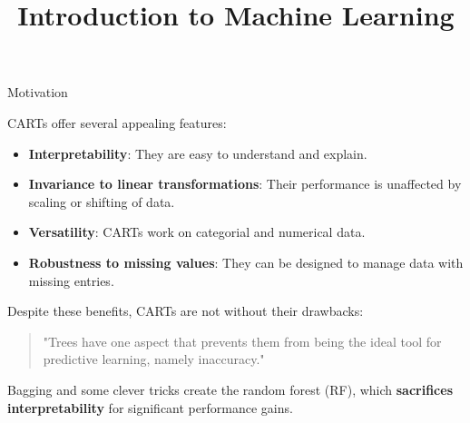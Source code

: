 \documentclass[11pt,compress,t,notes=noshow, xcolor=table]{beamer}
\title{Introduction to Machine Learning}
\institute{\href{https://compstat-lmu.github.io/lecture_i2ml/}{compstat-lmu.github.io/lecture\_i2ml}}
\date{}
\begin{document}
\sloppy

\begin{vbframe}{Motivation}

CARTs offer several appealing features:

\begin{itemize}
  \item \textbf{Interpretability}: They are easy to understand and explain.
  \item \textbf{Invariance to linear transformations}: Their performance is unaffected by scaling or shifting of data.
  \item \textbf{Versatility}: CARTs work on categorial and numerical data.
  \item \textbf{Robustness to missing values}: They can be designed to manage data with missing entries.
\end{itemize}

\vspace{1em}
Despite these benefits, CARTs are not without their drawbacks:
\vspace{1em}

\begin{quotation}
"Trees have one aspect that prevents them from being the ideal tool for predictive learning, namely inaccuracy."
\end{quotation}

\vspace{1em}
Bagging and some clever tricks create the random forest (RF), which \textbf{sacrifices interpretability} for significant performance gains.
\end{vbframe}
\end{document}
